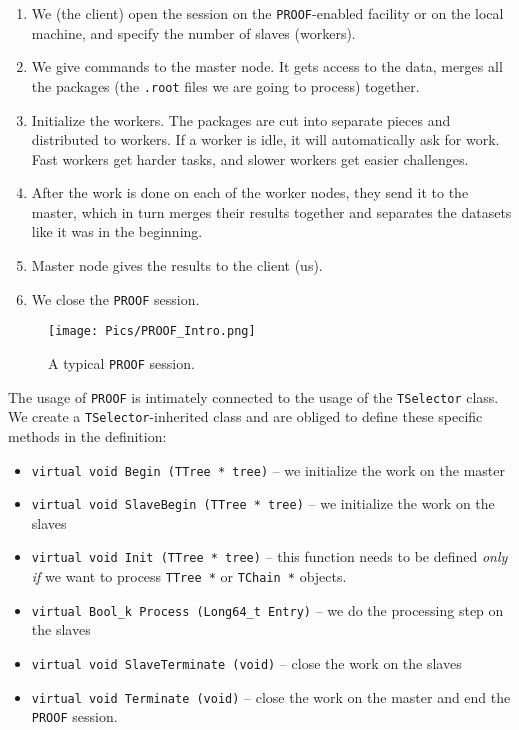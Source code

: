 \documentclass[a4paper, 12 pt, titlepage, twocolumn]{article}
\begin{document}
\begin{enumerate}
	\item{We (the client) open the session on the {\tt PROOF}-enabled facility or on the local machine,
		and specify the number of slaves (workers).}
	\item{We give commands to the master node. It gets access to the data, merges all the packages
		(the {\tt .root} files we are going to process) together.}
	\item{Initialize the workers. The packages are cut into separate pieces and distributed to workers.
		If a worker is idle, it will automatically ask for work. Fast workers get harder tasks, and
		slower workers get easier challenges.}
	\item{After the work is done on each of the worker nodes, they send it to the master, which in turn
		merges their results together and separates the datasets like it was in the beginning.}
	\item{Master node gives the results to the client (us).}
	\item{We close the {\tt PROOF} session.}
\end{enumerate}

\begin{figure}[H]
	\centering
	\texttt{[image: Pics/PROOF\_Intro.png]}
	\caption{A typical {\tt PROOF} session.}
	\label{fig:proof1}
\end{figure}

The usage of {\tt PROOF} is intimately connected to the usage of the {\tt TSelector} class. We create a 
{\tt TSelector}-inherited class and are obliged to define these specific methods in the definition:
\begin{itemize}
	\item{{\tt virtual void Begin (TTree * tree)} -- we initialize the work on the master}
	\item{{\tt virtual void SlaveBegin (TTree * tree)} -- we initialize the work on the slaves}
	\item{{\tt virtual void Init (TTree * tree)} -- this function needs to be defined \emph{only if} we 
		want to process {\tt TTree *} or {\tt TChain *} objects.}
	\item{{\tt virtual Bool\_k Process (Long64\_t Entry)} -- we do the processing step on the slaves}
	\item{{\tt virtual void SlaveTerminate (void)} -- close the work on the slaves}
	\item{{\tt virtual void Terminate (void)} -- close the work on the master and end the {\tt PROOF}
		session.}
\end{itemize}
\end{document}
